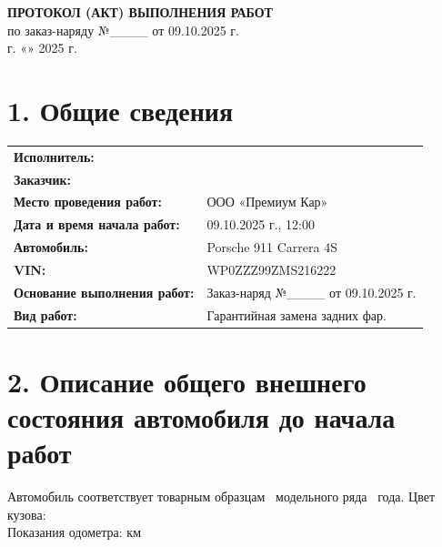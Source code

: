 	\begin{center}
	\textbf{\Large ПРОТОКОЛ (АКТ) ВЫПОЛНЕНИЯ РАБОТ}\\[0.5em]
	по заказ-наряду №\_\_\_\_ от 09.10.2025 г.\\[1em]
	г. \underline{\hspace{3cm}} \hfill «\underline{\hspace{1cm}}» \underline{\hspace{2cm}} 2025 г.
\end{center}

\vspace{1em}

\section*{1. Общие сведения}

\begin{tabularx}{\textwidth}{lX}
	\textbf{Исполнитель:} & \underline{\hspace{11cm}} \\[0.5em]
	\textbf{Заказчик:} & \underline{\hspace{11cm}} \\[0.5em]
	\textbf{Место проведения работ:} & ООО «Премиум Кар» \\[0.5em]
	\textbf{Дата и время начала работ:} & 09.10.2025 г., 12:00 \\[0.5em]
	\textbf{Автомобиль:} & Porsche 911 Carrera 4S \\[0.5em]
	\textbf{VIN:} & WP0ZZZ99ZMS216222 \\[0.5em]
	\textbf{Основание выполнения работ:} & Заказ-наряд №\_\_\_\_ от 09.10.2025 г. \\[0.5em]
	\textbf{Вид работ:} & Гарантийная замена задних фар. \\
\end{tabularx}

\vspace{1em}

\section*{2. Описание общего внешнего состояния автомобиля до начала работ}

Автомобиль соответствует товарным образцам \, модельного ряда  \, года.
Цвет кузова: \underline{\hspace{6cm}} \\
Показания одометра: \underline{\hspace{3cm}} км

